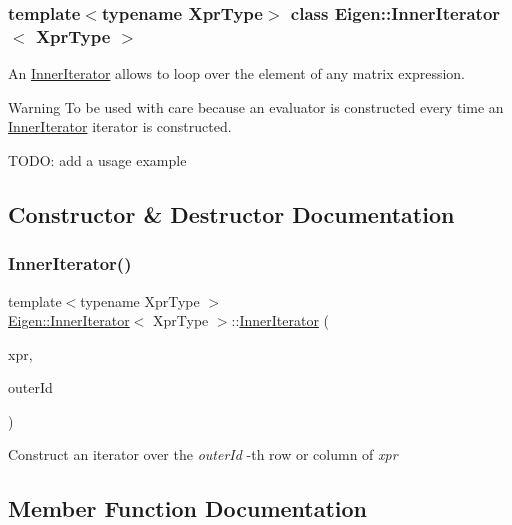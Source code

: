 \subsubsection*{template$<$typename Xpr\+Type$>$\newline
class Eigen\+::\+Inner\+Iterator$<$ Xpr\+Type $>$}

An \mbox{\hyperlink{class_eigen_1_1_inner_iterator}{Inner\+Iterator}} allows to loop over the element of any matrix expression. 

\begin{DoxyWarning}{Warning}
To be used with care because an evaluator is constructed every time an \mbox{\hyperlink{class_eigen_1_1_inner_iterator}{Inner\+Iterator}} iterator is constructed.
\end{DoxyWarning}
T\+O\+DO\+: add a usage example 

\subsection{Constructor \& Destructor Documentation}
\mbox{\label{class_eigen_1_1_inner_iterator_abbcdcf4d5ecb4445654b7940204cb750}} 
\subsubsection{\texorpdfstring{InnerIterator()}{InnerIterator()}}
{\footnotesize\ttfamily template$<$typename Xpr\+Type $>$ \\
\mbox{\hyperlink{class_eigen_1_1_inner_iterator}{Eigen\+::\+Inner\+Iterator}}$<$ Xpr\+Type $>$\+::\mbox{\hyperlink{class_eigen_1_1_inner_iterator}{Inner\+Iterator}} (\begin{DoxyParamCaption}\item[{const Xpr\+Type \&}]{xpr,  }\item[{const Index \&}]{outer\+Id }\end{DoxyParamCaption})\hspace{0.3cm}{\ttfamily [inline]}}

Construct an iterator over the {\itshape outer\+Id} -\/th row or column of {\itshape xpr} 

\subsection{Member Function Documentation}
\mbox{\label{class_eigen_1_1_inner_iterator_a1d2ccb720e90bc6928064cc30c41fb93}} 
